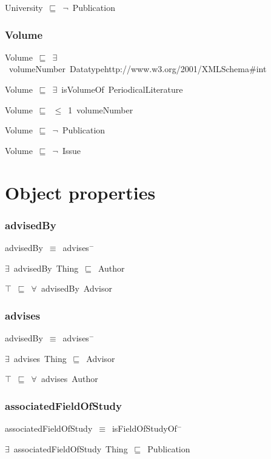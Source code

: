 \documentclass{article}
\begin{document}
University~\ensuremath{\sqsubseteq}~\ensuremath{\lnot}~Publication

\subsubsection*{Volume}

Volume~\ensuremath{\sqsubseteq}~\ensuremath{\exists}~volumeNumber~Datatypehttp://www.w3.org/2001/XMLSchema#int~

Volume~\ensuremath{\sqsubseteq}~\ensuremath{\exists}~isVolumeOf~PeriodicalLiterature~

Volume~\ensuremath{\sqsubseteq}~\ensuremath{\leq}~1~volumeNumber~

Volume~\ensuremath{\sqsubseteq}~\ensuremath{\lnot}~Publication

Volume~\ensuremath{\sqsubseteq}~\ensuremath{\lnot}~Issue

\section*{Object properties}\subsubsection*{advisedBy}

advisedBy~\ensuremath{\equiv}~advises\ensuremath{^-}

\ensuremath{\exists}~advisedBy~Thing~\ensuremath{\sqsubseteq}~Author

\ensuremath{\top}~\ensuremath{\sqsubseteq}~\ensuremath{\forall}~advisedBy~Advisor

\subsubsection*{advises}

advisedBy~\ensuremath{\equiv}~advises\ensuremath{^-}

\ensuremath{\exists}~advises~Thing~\ensuremath{\sqsubseteq}~Advisor

\ensuremath{\top}~\ensuremath{\sqsubseteq}~\ensuremath{\forall}~advises~Author

\subsubsection*{associatedFieldOfStudy}

associatedFieldOfStudy~\ensuremath{\equiv}~isFieldOfStudyOf\ensuremath{^-}

\ensuremath{\exists}~associatedFieldOfStudy~Thing~\ensuremath{\sqsubseteq}~Publication
\end{document}
